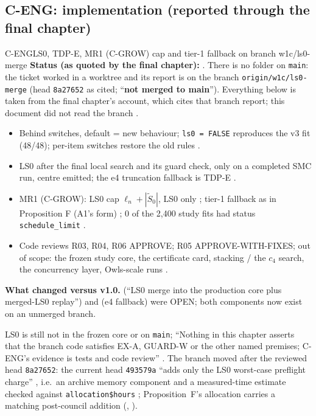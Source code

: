 \subsection{C-ENG: implementation (reported through the final chapter)}\label{sec:loop:eng}
\begin{card}{C-ENG}{LS0, TDP-E, MR1 (C-GROW) cap and tier-1 fallback on branch w1c/ls0-merge}
\textbf{Status (as quoted by the final chapter):} . There is no  folder on \texttt{main}: the ticket worked in a worktree and its report is on the branch \texttt{origin/w1c/ls0-merge} (head \texttt{8a27652} as cited; ``\textbf{not merged to main}''). Everything below is taken from the final chapter's account, which cites that branch report; this document did not read the branch .
\begin{itemize}
\item Behind switches, default = new behaviour; \texttt{ls0 = FALSE} reproduces the v3 fit (48/48); per-item switches restore the old rules .
\item LS0 after the final local search and its guard check, only on a completed SMC run, centre emitted; the e4 truncation fallback is TDP-E .
\item MR1 (C-GROW): LS0 cap $\ell_n+|\tilde S_0|$, LS0 only ; tier-1 fallback as in Proposition F (A1's form) ; 0 of the 2,400 study fits had status \texttt{schedule\_limit} .
\item Code reviews R03, R04, R06 APPROVE; R05 APPROVE-WITH-FIXES; out of scope: the frozen study core, the certificate card, stacking / the $c_4$ search, the concurrency layer, Owls-scale runs .
\end{itemize}
\textbf{What changed versus v1.0.}  (``LS0 merge into the production core plus merged-LS0 replay'') and  (e4 fallback) were OPEN; both components now exist on an unmerged branch.
\begin{notproved}
LS0 is still not in the frozen core or on \texttt{main}; ``Nothing in this chapter asserts that the branch code satisfies EX-A, GUARD-W or the other named premises; C-ENG's evidence is tests and code review'' . The branch moved after the reviewed head \texttt{8a27652}: the current head \texttt{493579a} ``adds only the LS0 worst-case preflight charge'' , i.e.\ an archive memory component and a measured-time estimate checked against \texttt{allocation\$hours} ; Proposition~F's allocation carries a matching post-council addition (, ).
\end{notproved}
\end{card}

